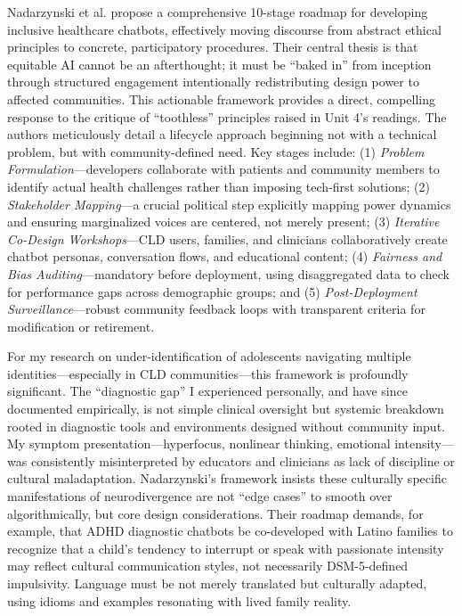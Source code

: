 \documentclass[11pt,twoside]{article}
\begin{document}
Nadarzynski et al. propose a comprehensive 10-stage roadmap for developing inclusive healthcare chatbots, effectively moving discourse from abstract ethical principles to concrete, participatory procedures. Their central thesis is that equitable AI cannot be an afterthought; it must be ``baked in'' from inception through structured engagement intentionally redistributing design power to affected communities. This actionable framework provides a direct, compelling response to the critique of ``toothless'' principles raised in Unit 4's readings. The authors meticulously detail a lifecycle approach beginning not with a technical problem, but with community-defined need. Key stages include: (1) \textit{Problem Formulation}---developers collaborate with patients and community members to identify actual health challenges rather than imposing tech-first solutions; (2) \textit{Stakeholder Mapping}---a crucial political step explicitly mapping power dynamics and ensuring marginalized voices are centered, not merely present; (3) \textit{Iterative Co-Design Workshops}---CLD users, families, and clinicians collaboratively create chatbot personas, conversation flows, and educational content; (4) \textit{Fairness and Bias Auditing}---mandatory before deployment, using disaggregated data to check for performance gaps across demographic groups; and (5) \textit{Post-Deployment Surveillance}---robust community feedback loops with transparent criteria for modification or retirement.

For my research on under-identification of adolescents navigating multiple identities---especially in CLD communities---this framework is profoundly significant. The ``diagnostic gap'' I experienced personally, and have since documented empirically, is not simple clinical oversight but systemic breakdown rooted in diagnostic tools and environments designed without community input. My symptom presentation---hyperfocus, nonlinear thinking, emotional intensity---was consistently misinterpreted by educators and clinicians as lack of discipline or cultural maladaptation. Nadarzynski's framework insists these culturally specific manifestations of neurodivergence are not ``edge cases'' to smooth over algorithmically, but core design considerations. Their roadmap demands, for example, that ADHD diagnostic chatbots be co-developed with Latino families to recognize that a child's tendency to interrupt or speak with passionate intensity may reflect cultural communication styles, not necessarily DSM-5-defined impulsivity. Language must be not merely translated but culturally adapted, using idioms and examples resonating with lived family reality.
\end{document}

